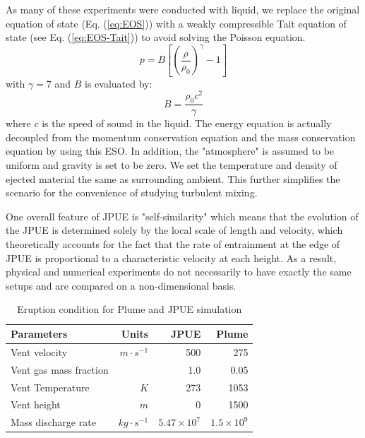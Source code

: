 As many of these experiments were conducted with liquid, we replace the original equation of state (Eq. (\ref{eq:EOS})) with a weakly compressible Tait equation of state \citep {becker2007weakly} (see Eq. (\ref{eq:EOS-Tait})) to avoid solving the Poisson equation.
\begin{equation}
p=B\left[\left(\dfrac{\rho}{\rho_0}\right)^{\gamma}-1\right]
\label{eq:EOS-Tait}
\end{equation}
with $\gamma=7$ and $B$ is evaluated by:
\begin{equation}
B=\dfrac{\rho_0 c^2}{\gamma}
\end{equation}
where $c$ is the speed of sound in the liquid. The energy equation is actually decoupled from the momentum conservation equation and the mass conservation equation by using this ESO. In addition, the "atmosphere" is assumed to be uniform and gravity is set to be zero. We set the temperature and density of ejected material the same as surrounding ambient. This further simplifies the scenario for the convenience of studying turbulent mixing. 

One overall feature of JPUE is "self-similarity" which means that the evolution of the JPUE is determined solely by the local scale of length and velocity, which theoretically accounts for the fact that the rate of entrainment at the edge of JPUE is proportional to a characteristic velocity at each height. As a result, physical and numerical experiments do not necessarily to have exactly the same setups and are compared on a non-dimensional basis.

\begin{table}[htp]
\centering
	\begin{centering}
      \caption{Eruption condition for Plume and JPUE simulation}		
	  \begin{tabular}{lrrr}
	    \hline
	    Parameters & Units  & JPUE & Plume \\
	    \hline
	    Vent velocity          & $m\cdot s^{-1}$  & 500               & 275 \\
	    Vent gas mass fraction &                  & 1.0               & 0.05 \\
	    Vent Temperature       & $K$              & 273               & 1053 \\
	    Vent height            & $m$              & 0                 & 1500 \\
	    Mass discharge rate    & $kg\cdot s^{-1}$ & $5.47 \times 10^7$ & $1.5 \times 10^9$\\
	    \hline
	  \end{tabular}
	  \label{tab:input_parameters}
	\end{centering}
\end{table}

